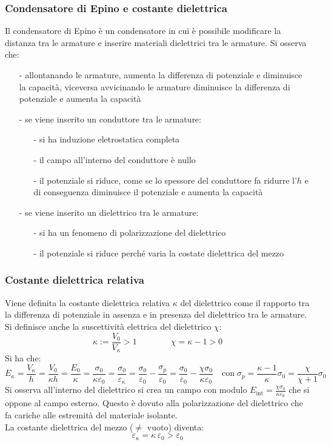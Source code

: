 \documentclass[a4paper]{article}
\begin{document}
\subsubsection*{Condensatore di Epino e costante dielettrica}
Il condensatore di Epino è un condensatore in cui è possibile modificare la distanza tra le armature e inserire materiali
dielettrici tra le armature. Si osserva che:
\begin{itemize}[topsep=3pt, itemsep=0pt]
	\item[-] allontanando le armature, aumenta la differenza di potenziale e diminuisce la capacità, viceversa avvicinando le
	armature diminuisce la differenza di potenziale e aumenta la capacità
	\item[-] se viene inserito un conduttore tra le armature:
	\begin{itemize}[topsep=0pt, itemsep=0pt]
		\item[-] si ha induzione eletrostatica completa
		\item[-] il campo all'interno del conduttore è nullo
		\item[-] il potenziale si riduce, come se lo spessore del conduttore fa ridurre l'\(h\) e di conseguenza diminuisce
		il potenziale e aumenta la capacità
	\end{itemize}
	\item[-] se viene inserito un dielettrico tra le armature:
	\begin{itemize}[topsep=0pt, itemsep=0pt]
		\item[-] si ha un fenomeno di polarizzazione del dielettrico
		\item[-] il potenziale si riduce perché varia la costate dielettrica del mezzo
	\end{itemize}
\end{itemize}

\subsubsection*{Costante dielettrica relativa}
Viene definita la costante dielettrica relativa \(\kappa\) del dielettrico come il rapporto tra la differenza di potenziale in
assenza e  in presenza del dielettrico tra le armature. Si definisce anche la suscettività elettrica del dielettrico \(\chi\):
\[\kappa := \frac{V_0}{V_\kappa} > 1 \qquad \qquad \chi = \kappa - 1 > 0\]
Si ha che:
\[E_\kappa = \frac{V_\kappa}{h} = \frac{V_0}{\kappa h} = \frac{E_0}{\kappa} = \frac{\sigma_0}{\kappa \varepsilon_0} = \frac{\sigma_0}{\varepsilon_\kappa} = \frac{\sigma_0}{\varepsilon_0} - \frac{\sigma_p}{\varepsilon_0} = \frac{\sigma_0}{\varepsilon_0} - \frac{\chi \sigma_0}{\kappa \varepsilon_0} \quad
\text{con} \; \sigma_p = \frac{\kappa-1}{\kappa} \sigma_0 = \frac{\chi}{\chi+1}\sigma_0\]
Si osserva all'interno del dielettrico si crea un campo con modulo \(\displaystyle E_\text{int} = \frac{\chi \sigma_0}{\kappa \varepsilon_0}\)
che si oppone al campo esterno. Questo è dovuto alla polarizzazione del dielettrico che fa  cariche alle estremità
del materiale isolante. \\[10pt]
La costante dielettrica del mezzo (\(\neq\) vuoto) diventa: \[\varepsilon_\kappa = \kappa \,  \varepsilon_0 > \varepsilon_0\]
\end{document}
